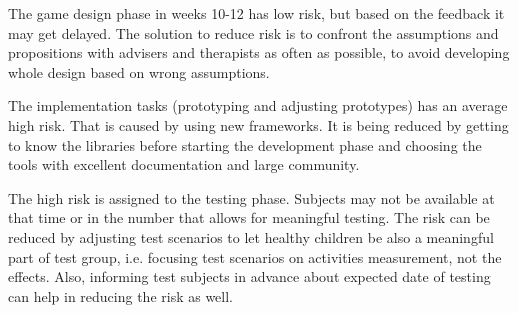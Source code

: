 \documentclass[10pt,a4paper]{article}
\begin{document}
The game design phase in weeks 10-12 has low risk, but based on the feedback it may get delayed. The solution to reduce risk is to confront the assumptions and propositions with advisers and therapists as often as possible, to avoid developing whole design based on wrong assumptions. 

The implementation tasks (prototyping and adjusting prototypes) has an average high risk. That is caused by using new frameworks. It is being reduced by getting to know the libraries before starting the development phase and choosing the tools with excellent documentation and large community. 

The high risk is assigned to the testing phase. Subjects may not be available at that time or in the number that allows for meaningful testing. The risk can be reduced by adjusting test scenarios to let healthy children be also a meaningful part of test group, i.e. focusing test scenarios on activities measurement, not the effects. Also, informing test subjects in advance about expected date of testing can help in reducing the risk as well.
\end{document}
